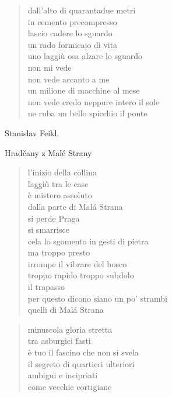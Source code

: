 \clearpage


	\begin{verse}
		dall'alto di quarantadue metri\\
		in cemento precompresso\\
		lascio cadere lo sguardo\\
		un rado formicaio di vita\\
		uno laggiù osa alzare lo sguardo\\
		non mi vede\\
		non vede accanto a me\\
		un milione di macchine al mese\\
		non vede credo neppure intero il sole\\
		ne ruba un bello spicchio il ponte
	\end{verse}

\clearpage


\begin{artItem}
	Stanislav Feikl, \begin{otherlanguage}{czech}%
		Hradčany z Malé Strany%
	\end{otherlanguage}
\end{artItem}

	\begin{verse}
		l'inizio della collina\\
		laggiù tra le case\\
		è mistero assoluto\\
		dalla parte di Malá Strana\\
		si perde Praga\\
		si smarrisce\\
		cela lo sgomento in gesti di pietra\\
		ma troppo presto\\
		irrompe il vibrare del bosco\\
		troppo rapido troppo subdolo\\
		il trapasso\\
		per questo dicono siano un po' strambi\\
		quelli di Malá Strana
	\end{verse}

\clearpage


	\begin{verse}
		minuscola gloria stretta\\
		tra asburgici fasti\\
		è tuo il fascino che non si svela\\
		il segreto di quartieri ulteriori\\
		ambigui e incipriati\\
		come vecchie cortigiane
	\end{verse}

